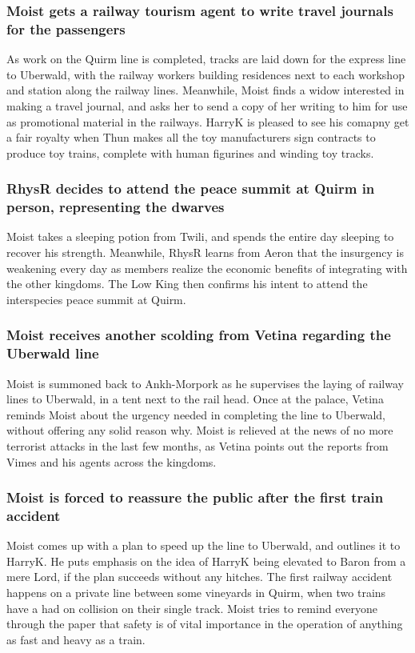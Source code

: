 \subsubsection{\Gls{Moist} gets a railway tourism agent to write travel journals for the passengers}
As work on the Quirm line is completed, tracks are laid down for the express line to Uberwald, with
the railway workers building residences next to each workshop and station along the railway lines.
Meanwhile, \Gls{Moist} finds a widow interested in making a travel journal, and asks her to send a
copy of her writing to him for use as promotional material in the railways. \Gls{HarryK} is pleased
to see his comapny get a fair royalty when \Gls{Thun} makes all the toy manufacturers sign contracts
to produce toy trains, complete with human figurines and winding toy tracks.

\subsubsection{\Gls{RhysR} decides to attend the peace summit at Quirm in person, representing the
    dwarves}
\Gls{Moist} takes a sleeping potion from \Gls{Twili}, and spends the entire day sleeping to recover
his strength. Meanwhile, \Gls{RhysR} learns from \Gls{Aeron} that the insurgency is weakening
every day as members realize the economic benefits of integrating with the other kingdoms. The Low
King then confirms his intent to attend the interspecies peace summit at Quirm.

\subsubsection{\Gls{Moist} receives another scolding from \Gls{Vetina} regarding the Uberwald line}
\Gls{Moist} is summoned back to Ankh-Morpork as he supervises the laying of railway lines to
Uberwald, in a tent next to the rail head. Once at the palace, \Gls{Vetina} reminds \Gls{Moist}
about the urgency needed in completing the line to Uberwald, without offering any solid reason why.
\Gls{Moist} is relieved at the news of no more terrorist attacks in the last few months, as
\Gls{Vetina} points out the reports from \Gls{Vimes} and his agents across the kingdoms.

\subsubsection{\Gls{Moist} is forced to reassure the public after the first train accident}
\Gls{Moist} comes up with a plan to speed up the line to Uberwald, and outlines it to \Gls{HarryK}.
He puts emphasis on the idea of \Gls{HarryK} being elevated to Baron from a mere Lord, if the plan
succeeds without any hitches. The first railway accident happens on a private line between some
vineyards in Quirm, when two trains have a had on collision on their single track. \Gls{Moist}
tries to remind everyone through the paper that safety is of vital importance in the operation of
anything as fast and heavy as a train.

